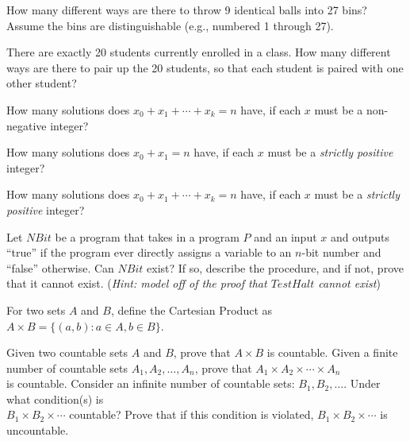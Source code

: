 \begin{Parts}
\Part How many different ways are there to throw 9 identical balls
  into 27 bins? Assume the bins are distinguishable (e.g., numbered 1
  through 27).
  
\Part There are exactly 20 students currently enrolled in a class.
  How many different ways are there to pair up the 20 students, so
  that each student is paired with one other student?


  
\Part How many solutions does $x_0 + x_1 + \cdots + x_k = n$ have, if each $x$ must be a non-negative integer?

\Part How many solutions does $x_0 + x_1 = n$ have, if each $x$ must be a \emph{strictly positive} integer?

\Part How many solutions does $x_0 + x_1 + \cdots + x_k = n$ have, if each $x$ must be a \emph{strictly positive} integer?

\end{Parts}


 Let $NBit$ be a program that takes in a program $P$ and an input $x$ and outputs ``true'' if the program ever directly assigns a variable to an $n$-bit number and ``false'' otherwise. Can $NBit$ exist? If so, describe the procedure, and if not, prove that it cannot exist. (\textit{Hint: model off of the proof that $TestHalt$ cannot exist})


For two sets $A$ and $B$, define the Cartesian Product as $A \times B = \{(a,b) : a \in A, b \in B \}$.

\begin{Parts}
	\Part Given two countable sets $A$ and $B$, prove that $A \times B$ is countable.
	\Part Given a finite number of countable sets $A_1, A_2, \dots, A_n$, prove that 
	$A_1 \times A_2 \times \cdots \times A_n$ \\is countable. 
	\Part Consider an infinite number of countable sets: $B_1, B_2, \dots$. Under what
	condition(s) is \\$B_1 \times B_2 \times \cdots$ countable? Prove that if this
	condition is violated, $B_1 \times B_2 \times \cdots$ is uncountable.
\end{Parts}

